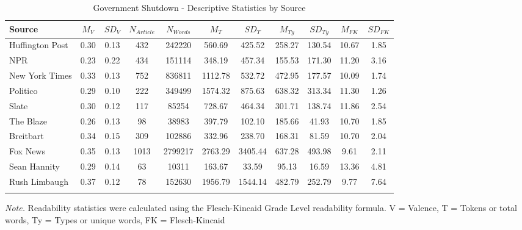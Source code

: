 \documentclass[
  man,floatsintext]{apa6}
\begin{document}
\begin{table}[h]

\begin{center}
\begin{threeparttable}

\caption{\label{tab:exp2-source-descriptives-gs}Government Shutdown - Descriptive Statistics by Source}

\footnotesize{

\begin{tabular}{lcccccccccc}
\toprule
Source & $M_V$ & $SD_V$ & $N_{Article}$ & $N_{Words}$ & $M_T$ & $SD_T$ & $M_{Ty}$ & $SD_{Ty}$ & $M_{FK}$ & $SD_{FK}$\\
\midrule
Huffington Post & 0.30 & 0.13 & 432 & 242220 & 560.69 & 425.52 & 258.27 & 130.54 & 10.67 & 1.85\\
NPR & 0.23 & 0.22 & 434 & 151114 & 348.19 & 457.34 & 155.53 & 171.30 & 11.20 & 3.16\\
New York Times & 0.33 & 0.13 & 752 & 836811 & 1112.78 & 532.72 & 472.95 & 177.57 & 10.09 & 1.74\\
Politico & 0.29 & 0.10 & 222 & 349499 & 1574.32 & 875.63 & 638.32 & 313.34 & 11.30 & 1.26\\
Slate & 0.30 & 0.12 & 117 & 85254 & 728.67 & 464.34 & 301.71 & 138.74 & 11.86 & 2.54\\
The Blaze & 0.26 & 0.13 & 98 & 38983 & 397.79 & 102.10 & 185.66 & 41.93 & 10.70 & 1.85\\
Breitbart & 0.34 & 0.15 & 309 & 102886 & 332.96 & 238.70 & 168.31 & 81.59 & 10.70 & 2.04\\
Fox News & 0.35 & 0.13 & 1013 & 2799217 & 2763.29 & 3405.44 & 637.28 & 493.98 & 9.61 & 2.11\\
Sean Hannity & 0.29 & 0.14 & 63 & 10311 & 163.67 & 33.59 & 95.13 & 16.59 & 13.36 & 4.81\\
Rush Limbaugh & 0.37 & 0.12 & 78 & 152630 & 1956.79 & 1544.14 & 482.79 & 252.79 & 9.77 & 7.64\\
\bottomrule
\addlinespace
\end{tabular}

}

\begin{tablenotes}[para]
\normalsize{\textit{Note.} Readability statistics were calculated using the Flesch-Kincaid Grade Level readability formula. V = Valence, T = Tokens or total words, Ty = Types or unique words, FK = Flesch-Kincaid}
\end{tablenotes}

\end{threeparttable}
\end{center}

\end{table}
\end{document}
